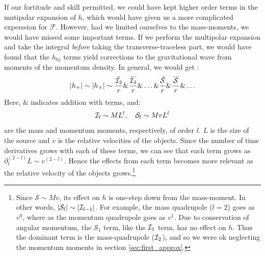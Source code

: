 If our fortitude and skill permitted, we could have kept higher order terms in the mutipolar expansion of $h$, which would have given us a more complicated experssion for $\mathcal{F}$. However, had we limited ourselves to the mass-moments, we would have missed some important terms. If we perform the multipolar expansion and take the integral \emph{before} taking the transverse-traceless part, we would have found that the $h_{0j}$ terms yield corrections to the gravitational wave from moments of the momentum density. In general, we would get \cite{ref:BlanfordThorne}:
\begin{equation}
|h_{+}| \sim |h_{\times}| \sim \frac{\ddot{\mathcal{I}_2}}{r} \& \frac{\dddot{\mathcal{I}_3}}{r} \& \ldots \& \frac{\ddot{\mathcal{S}}}{r} \& \frac{\dddot{\mathcal{S}}}{r} \& \ldots
\end{equation}
Here, $\&$ indicates addition with terms, and:
\begin{equation}
\mathcal{I}_l \sim ML^l, \quad \mathcal{S}_l \sim MvL^l
\end{equation}
are the mass and momentum moments, respectively, of order $l$. $L$ is the size of the source and $v$ is the relative velocities of the objects. Since the number of time derivatives grows with each of these terms, we can see that each term grows as $\partial_t^{(2-l)} L \sim v^{(2-l)}$. Hence the effects from each term becomes more relevant as the relative velocity of the objects grows.\footnote{Since $\mathcal{S} \sim Mv$, its effect on $h$ is one-step down from the mass-moment. In other words, $|\mathcal{S}_l| \sim |\mathcal{I}_{l-1}|$. For example, the mass quadrupole ($l=2$) goes as $v^0$, where as the momentum quadrupole goes as $v^1$. Due to conservation of angular momentum, the $\mathcal{S}_1$ term, like the $\mathcal{I}_1$ term, has no effect on $h$. Thus the dominant term is the mass-quadrupole ($\mathcal{I}_2$), and so we were ok neglecting the momentum moments in section \ref{sec:first_approx}.}

